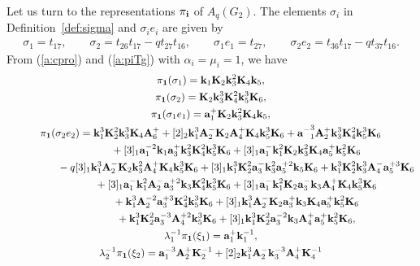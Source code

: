 \documentclass[11pt]{article}
\def\bk{{\bf k}}
\def\bK{{\bf K}}
\def\am{{{\bf a}^-}}
\begin{document}
Let us turn to the representations $\pi_{{\bf i}}$ of $A_q(G_2)$.
The elements $\sigma_i$ in Def\/inition~\ref{def:sigma}
and $\sigma_ie_i$
are given by
\begin{gather}\label{g:kobetsu}
\sigma_1 = t_{17}, \qquad
\sigma_2 = t_{26}t_{17}-qt_{27}t_{16},\qquad
\sigma_1 e_1 = t_{27},\qquad
\sigma_2e_2 = t_{36}t_{17}-qt_{37}t_{16}.
\end{gather}
From (\ref{a:cpro}) and (\ref{a:piTg}) with $\alpha_i=\mu_i=1$, we have
\begin{gather*}
\pi_{\bf 1}(\sigma_1)=\bk_1 \bK_2 \bk^{2}_3 \bK_4 \bk_5,\\
\pi_{\bf 1}(\sigma_2)=\bK_2 \bk^{3}_3 \bK^{2}_4 \bk^{3}_5 \bK_6,\\
\pi_{\bf 1}(\sigma_1e_1)={\bf a}^+_1 \bK_2 \bk^{2}_3 \bK_4 \bk_5,\\
\pi_{\bf 1}(\sigma_2e_2)=\bk^{3}_1 \bK^{2}_2 \bk^{3}_3 \bK_4 {\bf A}^+_6
 + [2]_2 \bk^{3}_1 {\bf A}^-_2 \bK_2 {\bf A}^+_4 \bK_4 \bk^{3}_5 \bK_6
 + \am_1^3 {\bf A}^+_2 \bk^{3}_3 \bK^{2}_4 \bk^{3}_5 \bK_6\\
 \hphantom{\pi_{\bf 1}(\sigma_2e_2)=}{}
 + [3]_1 {\bf a}_1^{-2} \bk_1 {\bf a}^+_3 \bk^{2}_3 \bK^{2}_4 \bk^{3}_5 \bK_6
 + [3]_1 {\bf a}^-_1 \bk^{2}_1 \bK_2 \bk^{2}_3 \bK_4 {\bf a}^+_5 \bk^{2}_5 \bK_6\\
 \hphantom{\pi_{\bf 1}(\sigma_2e_2)=}{}
 - q [3]_1 \bk^{3}_1 {\bf A}^-_2 \bK_2 \bk^{2}_3 {\bf A}^+_4 \bK_4 \bk^{3}_5 \bK_6
 + [3]_1 \bk^{3}_1 \bK^{2}_2 {\bf a}^-_3 \bk^{2}_3 {\bf a}_5^{+2} \bk_5 \bK_6
 + \bk^{3}_1 \bK^{2}_2 \bk^{3}_3 {\bf A}^-_4 {\bf a}_5^{+3} \bK_6\\
 \hphantom{\pi_{\bf 1}(\sigma_2e_2)=}{}
 + [3]_1 {\bf a}^-_1 \bk^{2}_1 {\bf A}^-_2 {\bf a}_3^{+2} \bk_3 \bK^{2}_4 \bk^{3}_5 \bK_6
 + [3]_1 {\bf a}^-_1 \bk^{2}_1 \bK_2 {\bf a}^-_3 \bk_3 {\bf A}^+_4 \bK_4 \bk^{3}_5 \bK_6\\
\hphantom{\pi_{\bf 1}(\sigma_2e_2)=}{}
 + \bk^{3}_1 {\bf A}_2^{-2} {\bf a}_3^{+3} \bK^{2}_4 \bk^{3}_5 \bK_6
 + [3]_1 \bk^{3}_1 {\bf A}^-_2 \bK_2 {\bf a}^+_3 \bk_3 \bK_4 {\bf a}^+_5 \bk^{2}_5 \bK_6\\
\hphantom{\pi_{\bf 1}(\sigma_2e_2)=}{}
 + \bk^{3}_1 \bK^{2}_2 {\bf a}_3^{-3} {\bf A}_4^{+2} \bk^{3}_5 \bK_6
 + [3]_1 \bk^{3}_1 \bK^{2}_2 {\bf a}_3^{-2} \bk_3 {\bf A}^+_4 {\bf a}^+_5 \bk^{2}_5 \bK_6,\\
\lambda_1^{-1}\pi_{\bf 1}(\xi_1)={\bf a}^+_1 \bk^{-1}_1,\\
\lambda_2^{-1}\pi_{\bf 1}(\xi_2)={\bf a}_1^{-3} {\bf A}^+_2 \bK^{-1}_2
 + [2]_2 \bk^{3}_1 {\bf A}^-_2 \bk^{-3}_3 {\bf A}^+_4 \bK^{-1}_4

\end{gather*}
\end{document}
